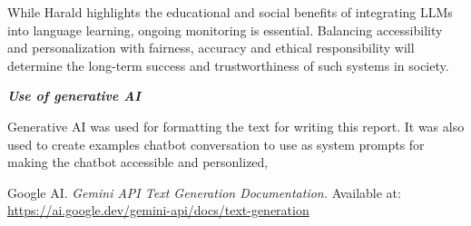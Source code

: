 \documentclass[a4paper,10pt]{article}
\begin{document}
While Harald highlights the educational and social benefits of integrating LLMs into language learning, ongoing monitoring is essential. Balancing accessibility and personalization with fairness, accuracy and ethical responsibility will determine the long-term success and trustworthiness of such systems in society.
	
\hfill \break
\textit{\textbf{Use of generative AI}}

Generative AI was used for formatting the text for writing this report. It was also used to create examples chatbot conversation to use as system prompts for making the chatbot accessible and personlized,


\hfill \break


\begin{thebibliography}{1}

Google AI. \textit{Gemini API Text Generation Documentation.} 
Available at: \url{https://ai.google.dev/gemini-api/docs/text-generation}

\end{thebibliography}


	
	
%	
%	
%	
\end{document}

